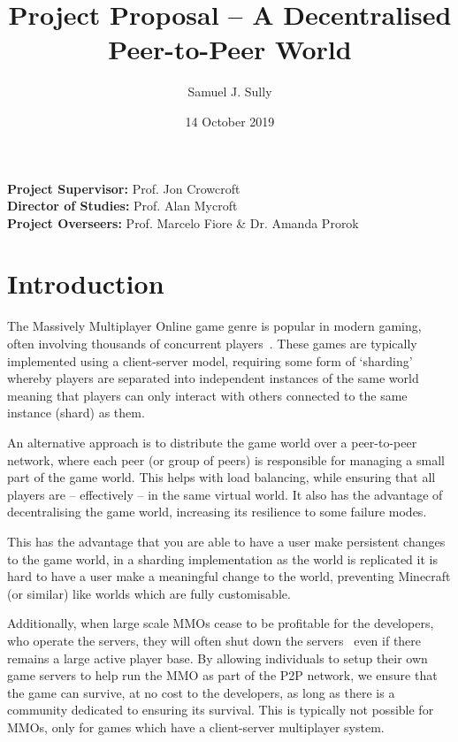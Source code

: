 \documentclass[12pt,a4paper]{article}
\begin{document}
	\title{Project Proposal -- A Decentralised Peer-to-Peer World}
	\author{Samuel J. Sully}
	\date{14 October 2019}
	\maketitle
	\thispagestyle{empty}
	
	\noindent
	\textbf{Project Supervisor:} Prof. Jon Crowcroft\\
	\textbf{Director of Studies:} Prof. Alan Mycroft\\
	\textbf{Project Overseers:} Prof. Marcelo Fiore \&  Dr. Amanda Prorok

	\section{Introduction}
	
	The Massively Multiplayer Online game genre is popular in modern gaming, often involving thousands of concurrent players~\cite{wowstat}. These games are typically implemented using a client-server model, requiring some form of `sharding'~\cite{shard} whereby players are separated into independent instances of the same world meaning that players can only interact with others connected to the same instance (shard) as them.
	
	An alternative approach is to distribute the game world over a peer-to-peer network, where each peer (or group of peers) is responsible for managing a small part of the game world. This helps with load balancing, while ensuring that all players are -- effectively -- in the same virtual world. It also has the advantage of decentralising the game world, increasing its resilience to some failure modes.
	
	This has the advantage that you are able to have a user make persistent changes to the game world, in a sharding implementation as the world is replicated it is hard to have a user make a meaningful change to the world, preventing Minecraft (or similar) like worlds which are fully customisable.
	
	Additionally, when large scale MMOs cease to be profitable for the developers, who operate the servers, they will often shut down the servers~\cite{down} even if there remains a large active player base. By allowing individuals to setup their own game servers to help run the MMO as part of the P2P network, we ensure that the game can survive, at no cost to the developers, as long as there is a community dedicated to ensuring its survival. This is typically not possible for MMOs, only for games which have a client-server multiplayer system.
	
\end{document}
